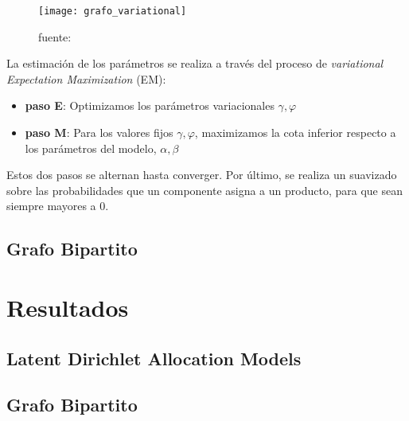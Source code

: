 \documentclass[class=article, crop=false]{standalone}
\begin{document}
\begin{figure}[h]
	\centering	
	\texttt{[image: grafo\_variational]}
	\caption{fuente: \cite{blei2003latent}}
	\label{fig:grafo_variational}
\end{figure}


La estimación de los parámetros se realiza a través del proceso de \emph{variational Expectation Maximization} (EM):

\begin{itemize}
\item \textbf{paso E}: Optimizamos los parámetros variacionales $\gamma, \varphi$
\item \textbf{paso M}: Para los valores fijos $\gamma, \varphi$, maximizamos la cota inferior respecto a los parámetros del modelo, $\alpha,\beta$
\end{itemize}

Estos dos pasos se alternan hasta converger. Por último, se realiza un suavizado sobre las probabilidades que un componente asigna a un producto, para que sean siempre mayores a 0.



\subsection{Grafo Bipartito}

\section{Resultados}

\subsection{Latent Dirichlet Allocation Models}

\subsection{Grafo Bipartito}



%
%
%
\end{document}

